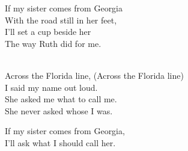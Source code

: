 \begin{lyrics}
If my sister comes from Georgia\\
With the road still in her feet,\\
I’ll set a cup beside her\\
The way Ruth did for me.

\\
Across the Florida line,
(Across the Florida line)\\
I said my name out loud.\\
She asked me what to call me.\\
She never asked whose I was.

If my sister comes from Georgia,\\
I’ll ask what I should call her.
\end{lyrics}

